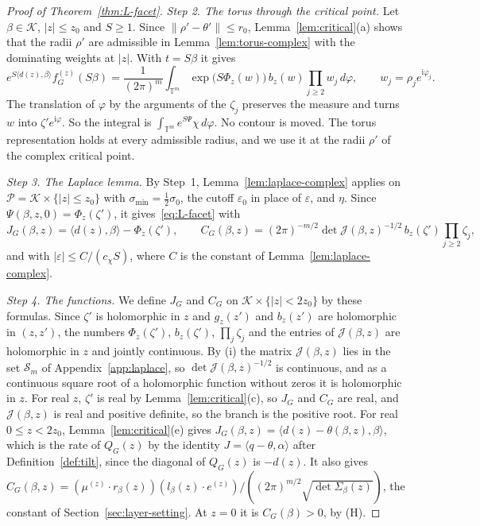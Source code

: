 \begin{proof}[Proof of Theorem~\ref{thm:L-facet}]
\emph{Step 2. The torus through the critical point.} Let $\beta\in\mathcal K$, $|z|\le z_0$ and
$S\ge1$. Since $\lVert\rho'-\theta'\rVert\le r_0$, Lemma~\ref{lem:critical}(a) shows that the
radii $\rho'$ are admissible in Lemma~\ref{lem:torus-complex} with the dominating weights at
$|z|$. With $t=S\beta$ it gives
\[
e^{S\langle d(z),\beta\rangle}f^{(z)}_G(S\beta)=\frac1{(2\pi)^m}\int_{\mathbb T^m}
\exp\bigl(S\Phi_z(w)\bigr)\,b_z(w)\prod_{j\ge2}w_j\,d\varphi,\qquad w_j=\rho_je^{\mathrm i\varphi_j}.
\]
The translation of $\varphi$ by the arguments of the $\zeta_j$ preserves the measure and turns $w$
into $\zeta'e^{\mathrm i\varphi}$. So the integral is $\int_{\mathbb T^m}e^{S\Psi}\chi\,d\varphi$.
No contour is moved. The torus representation holds at every admissible radius, and we use it at
the radii $\rho'$ of the complex critical point.

\emph{Step 3. The Laplace lemma.} By Step~1, Lemma~\ref{lem:laplace-complex} applies on
$\mathcal P=\mathcal K\times\{|z|\le z_0\}$ with $\sigma_{\min}=\frac12\sigma_0$, the cutoff $\varepsilon_0$ in place of $\varepsilon$,
and $\eta$. Since $\Psi(\beta,z,0)=\Phi_z(\zeta')$, it gives~\eqref{eq:L-facet} with
\[
J_G(\beta,z)=\langle d(z),\beta\rangle-\Phi_z(\zeta'),\qquad
C_G(\beta,z)=(2\pi)^{-m/2}\det\mathcal J(\beta,z)^{-1/2}\,b_z(\zeta')\prod_{j\ge2}\zeta_j,
\]
and with $|\varepsilon|\le C/(c_\chi S)$, where $C$ is the constant of
Lemma~\ref{lem:laplace-complex}.

\emph{Step 4. The functions.} We define $J_G$ and $C_G$ on $\mathcal K\times\{|z|<2z_0\}$ by these
formulas. Since $\zeta'$ is holomorphic in $z$ and $g_z(z')$ and $b_z(z')$ are holomorphic in
$(z,z')$, the numbers $\Phi_z(\zeta')$, $b_z(\zeta')$, $\prod_j\zeta_j$ and the entries of
$\mathcal J(\beta,z)$ are holomorphic in $z$ and jointly continuous. By (i) the matrix
$\mathcal J(\beta,z)$ lies in the set $\mathcal S_m$ of Appendix~\ref{app:laplace}, so
$\det\mathcal J(\beta,z)^{-1/2}$ is continuous, and as a continuous square root of a holomorphic
function without zeros it is holomorphic in $z$. For real $z$, $\zeta'$ is real by
Lemma~\ref{lem:critical}(c), so $J_G$ and $C_G$ are real, and $\mathcal J(\beta,z)$ is real and
positive definite, so the branch is the positive root. For real $0\le z<2z_0$,
Lemma~\ref{lem:critical}(e) gives $J_G(\beta,z)=\langle d(z)-\theta(\beta,z),\beta\rangle$, which is
the rate of $Q_G(z)$ by the identity $J=\langle q-\theta,\alpha\rangle$ after
Definition~\ref{def:tilt}, since the diagonal of $Q_G(z)$ is $-d(z)$. It also gives
$C_G(\beta,z)=(\mu^{(z)}\cdot r_\beta(z))(l_\beta(z)\cdot e^{(z)})/((2\pi)^{m/2}\sqrt{\det\Sigma_\beta(z)})$,
the constant of Section~\ref{sec:layer-setting}. At $z=0$ it is $C_G(\beta)>0$, by (H).
\end{proof}

